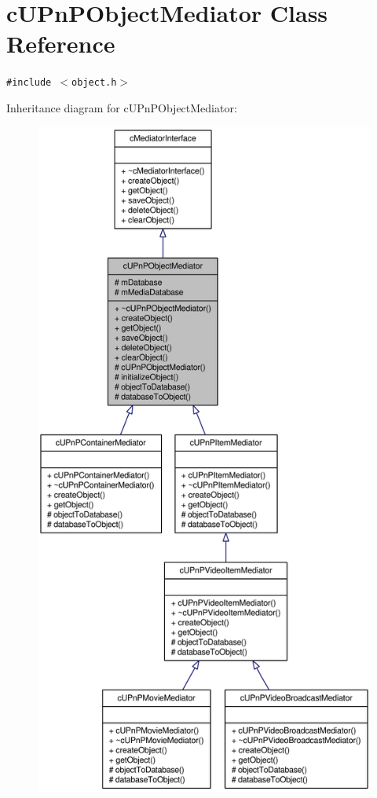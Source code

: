 \hypertarget{classcUPnPObjectMediator}{
\section{cUPnPObjectMediator Class Reference}
\label{classcUPnPObjectMediator}
}
{\tt \#include $<$object.h$>$}

Inheritance diagram for cUPnPObjectMediator:\nopagebreak
\begin{figure}[H]
\begin{center}
\leavevmode
\includegraphics[width=400pt]{classcUPnPObjectMediator__inherit__graph}
\end{center}
\end{figure}
